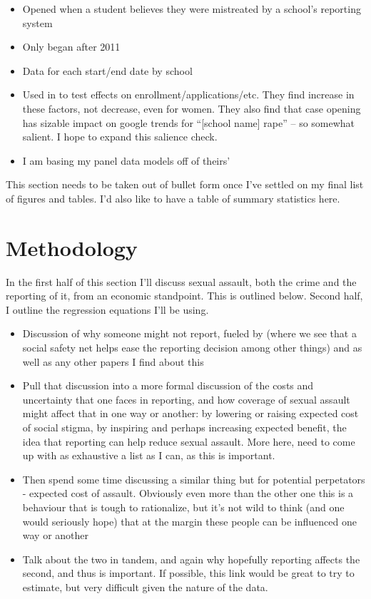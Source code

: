 \documentclass[AER,draftmode]{AEA}
\begin{document}
\begin{itemize}
    \begin{itemize}
        \item Opened when a student believes they were mistreated by a school's reporting system
        \item Only began after 2011
        \item Data for each start/end date by school
        \item Used in  to test effects on enrollment/applications/etc. They find increase in these factors, not decrease, even for women. They also find that case opening has sizable impact on google trends for “[school name] rape” – so somewhat salient. I hope to expand this salience check.
        \item I am basing my panel data models off of theirs'
    \end{itemize}
\end{itemize}

This section needs to be taken out of bullet form once I've settled on my final list of figures and tables. I'd also like to have a table of summary statistics here.

\section{Methodology}

In the first half of this section I'll discuss sexual assault, both the crime and the reporting of it, from an economic standpoint. This is outlined below. Second half, I outline the regression equations I'll be using.

\begin{itemize}
    \item Discussion of why someone might not report, fueled by  (where we see that a social safety net helps ease the reporting decision among other things) and  as well as any other papers I find about this
    \item Pull that discussion into a more formal discussion of the costs and uncertainty that one faces in reporting, and how coverage of sexual assault might affect that in one way or another: by lowering or raising expected cost of social stigma, by inspiring and perhaps increasing expected benefit, the idea that reporting can help reduce sexual assault. More here, need to come up with as exhaustive a list as I can, as this is important.
    \item Then spend some time discussing a similar thing but for potential perpetators - expected cost of assault. Obviously even more than the other one this is a behaviour that is tough to rationalize, but it's not wild to think (and one would seriously hope) that at the margin these people can be influenced one way or another
    \item Talk about the two in tandem, and again why hopefully reporting affects the second, and thus is important. If possible, this link would be great to try to estimate, but very difficult given the nature of the data. 
\end{itemize}
\end{document}
